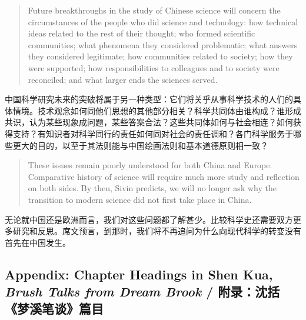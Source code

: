 \documentclass[UTF8,zihao=-4]{ctexart}
\newenvironment{enblock}
  {\par\smallskip\noindent{\scriptsize\bfseries English}\par\begin{quote}\small}
  {\end{quote}}
\newenvironment{zhblock}
  {\par\noindent{\scriptsize\bfseries 中文}\par}
  {\par\medskip}
\begin{document}
\begin{enblock}
Future breakthroughs in the study of Chinese science will concern the circumstances of the people who did science and technology: how technical ideas related to the rest of their thought; who formed scientific communities; what phenomena they considered problematic; what answers they considered legitimate; how communities related to society; how they were supported; how responsibilities to colleagues and to society were reconciled; and what larger ends the sciences served.
\end{enblock}
\begin{zhblock}
中国科学研究未来的突破将属于另一种类型：它们将关乎从事科学技术的人们的具体情境。技术观念如何同他们思想的其他部分相关？科学共同体由谁构成？谁形成共识，认为某些现象成问题，某些答案合法？这些共同体如何与社会相连？如何获得支持？有知识者对科学同行的责任如何同对社会的责任调和？各门科学服务于哪些更大的目的，以至于其法则能与中国绘画法则和基本道德原则相一致？
\end{zhblock}

\begin{enblock}
These issues remain poorly understood for both China and Europe. Comparative history of science will require much more study and reflection on both sides. By then, Sivin predicts, we will no longer ask why the transition to modern science did not first take place in China.
\end{enblock}
\begin{zhblock}
无论就中国还是欧洲而言，我们对这些问题都了解甚少。比较科学史还需要双方更多研究和反思。席文预言，到那时，我们将不再追问为什么向现代科学的转变没有首先在中国发生。
\end{zhblock}

\subsection*{Appendix: Chapter Headings in Shen Kua, \emph{Brush Talks from Dream Brook} / 附录：沈括《梦溪笔谈》篇目}
\end{document}
